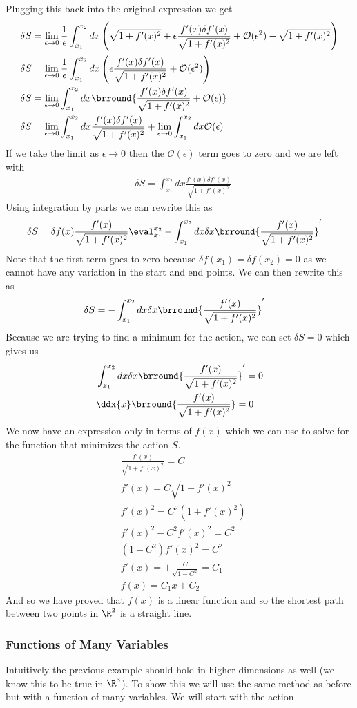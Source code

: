 Plugging this back into the original expression we get
\begin{align*}
    &\delta S=\lim_{\epsilon\to0}\frac{1}{\epsilon} \int_{x_1}^{x_2}dx\left(\sqrt{1+f'(x)^2}+\epsilon\frac{f'(x)\delta f'(x)}{\sqrt{1+f'(x)^2}}+\mathcal{O}(\epsilon^2)-\sqrt{1+f'(x)^2}\right)\\
    &\delta S=\lim_{\epsilon\to0}\frac{1}{\epsilon} \int_{x_1}^{x_2}dx\left(\epsilon\frac{f'(x)\delta f'(x)}{\sqrt{1+f'(x)^2}}+\mathcal{O}(\epsilon^2)\right)\\
    &\delta S=\lim_{\epsilon\to0}\int_{x_1}^{x_2}dx\brround{\frac{f'(x)\delta f'(x)}{\sqrt{1+f'(x)^2}}+\mathcal{O}(\epsilon)}\\
    &\delta S=\lim_{\epsilon\to0}\int_{x_1}^{x_2}dx\frac{f'(x)\delta f'(x)}{\sqrt{1+f'(x)^2}}+\lim_{\epsilon\to0}\int_{x_1}^{x_2}dx\mathcal{O}(\epsilon)
\end{align*}
If we take the limit as $\epsilon\to0$ then the $\mathcal{O}(\epsilon)$ term goes to zero and we are left with
\begin{align*}
    &\delta S=\int_{x_1}^{x_2}dx\frac{f'(x)\delta f'(x)}{\sqrt{1+f'(x)^2}}
\end{align*}
Using integration by parts we can rewrite this as
\begin{align*}
    &\delta S=\delta f(x)\frac{f'(x)}{\sqrt{1+f'(x)^2}}\eval_{x_1}^{x_2}-\int_{x_1}^{x_2}dx\delta x\brround{\frac{f'(x)}{\sqrt{1+f'(x)^2}}}'
\end{align*}
Note that the first term goes to zero because $\delta f(x_1)=\delta f(x_2)=0$ as we cannot have any variation in the start and end points. We can then rewrite this as
\begin{align*}
    &\delta S=-\int_{x_1}^{x_2}dx\delta x\brround{\frac{f'(x)}{\sqrt{1+f'(x)^2}}}'
\end{align*}
Because we are trying to find a minimum for the action, we can set $\delta S=0$ which gives us
\begin{align*}
    &\int_{x_1}^{x_2}dx\delta x\brround{\frac{f'(x)}{\sqrt{1+f'(x)^2}}}'=0\\
    &\ddx{x}\brround{\frac{f'(x)}{\sqrt{1+f'(x)^2}}}=0
\end{align*}
We now have an expression only in terms of $f(x)$ which we can use to solve for the function that minimizes the action $S$.
\begin{align*}
    &\frac{f'(x)}{\sqrt{1+f'(x)^2}}=C\\
    &f'(x)=C\sqrt{1+f'(x)^2}\\
    &f'(x)^2=C^2(1+f'(x)^2)\\
    &f'(x)^2-C^2f'(x)^2=C^2\\
    &(1-C^2)f'(x)^2=C^2\\
    &f'(x)=\pm\frac{C}{\sqrt{1-C^2}}=C_1\\
    &f(x)=C_1x+C_2
\end{align*}
And so we have proved that $f(x)$ is a linear function and so the shortest path between two points in $\R^2$ is a straight line.

\subsubsection{Functions of Many Variables}
Intuitively the previous example should hold in higher dimensions as well (we know this to be true in $\R^3$). To show this we will use the same method as before but with a function of many variables. We will start with the action
